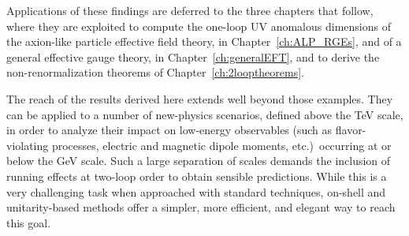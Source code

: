 Applications of these findings are deferred to the three chapters that follow, where they are exploited to compute the one-loop UV anomalous dimensions of the axion-like particle effective field theory, in Chapter~\ref{ch:ALP_RGEs}, and of a general effective gauge theory, in Chapter~\ref{ch:generalEFT}, and to derive the non-renormalization theorems of Chapter~\ref{ch:2looptheorems}.

The reach of the results derived here extends well beyond those examples.
They can be applied to a number of new-physics scenarios, 
defined above the TeV scale, in order to analyze their impact on 
low-energy observables (such as flavor-violating processes, 
electric and magnetic dipole moments, etc.)\ occurring at or 
below the GeV scale.
Such a large separation of scales demands the inclusion of 
running effects at two-loop order to obtain sensible predictions. 
While this is a very challenging task when approached with standard techniques, 
on-shell and unitarity-based methods offer a simpler, more efficient, 
and elegant way to reach this goal. 

